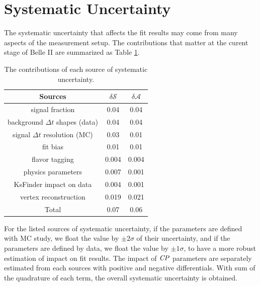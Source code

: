 \section{Systematic Uncertainty}
The systematic uncertainty that affects the fit results may come from many aspects of the measurement setup. The contributions that matter at the curent stage of Belle II are summarized as Table \ref{tab:sy_sub}.

\begin{table}
	\centering
	\begin{tabular}{c|c|c} 
		\hline
		Sources &  $\delta \mathcal{S}$ & $\delta \mathcal{A}$\\
		\hline
		signal fraction  & 0.04 & 0.04 \\
		background $\Delta t$ shapes (data) & 0.04 & 0.04\\
		signal $\Delta t$ resolution (MC) & 0.03 & 0.01 \\
		fit bias & 0.01 & 0.01 \\
		flavor tagging  & 0.004 & 0.004 \\
		physics parameters & 0.007 & 0.001\\ 
		KsFinder impact on data & 0.004 & 0.001\\
		vertex reconstruction & 0.019 & 0.021\\
		\hline
		Total & 0.07 & 0.06\\
		\hline
	\end{tabular}
	\caption{The contributions of each source of systematic uncertainty.}
	\label{tab:sy_sub}
\end{table}

For the listed sources of systematic uncertainty, if the parameters are defined with MC study, we float the value by $\pm 2 \sigma$ of their uncertainty, and if the parameters are defined by data, we float the value by $\pm 1 \sigma$, to have a more robust estimation of impact on fit results. The impact of $\it{CP}$ parameters are separately estimated from each sources with positive and negative differentials. With sum of the quadrature of each term, the overall systematic uncertainty is obtained. 



